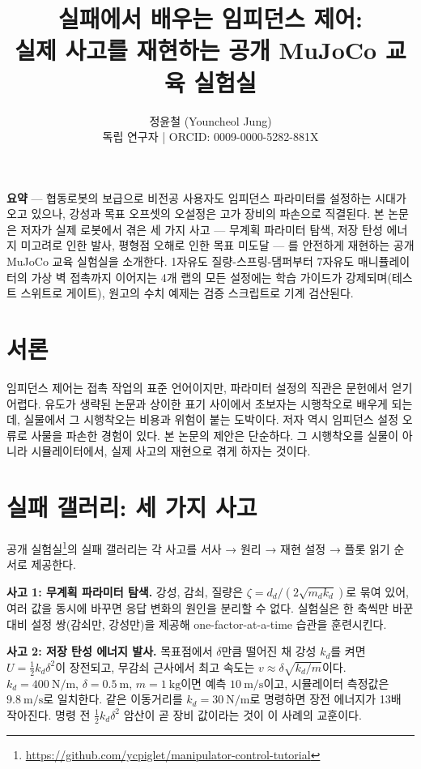 \documentclass[10pt,a4paper,twocolumn]{article}
\title{\textbf{실패에서 배우는 임피던스 제어:\\실제 사고를 재현하는 공개 MuJoCo 교육 실험실}}
\author{정윤철 (Youncheol Jung)\\
\small 독립 연구자 | ORCID: 0009-0000-5282-881X}
\date{}
\begin{document}
\maketitle

\noindent\textbf{요약} ---
협동로봇의 보급으로 비전공 사용자도 임피던스 파라미터를 설정하는 시대가
오고 있으나, 강성과 목표 오프셋의 오설정은 고가 장비의 파손으로 직결된다.
본 논문은 저자가 실제 로봇에서 겪은 세 가지 사고 --- 무계획 파라미터 탐색,
저장 탄성 에너지 미고려로 인한 발사, 평형점 오해로 인한 목표 미도달 ---
를 안전하게 재현하는 공개 MuJoCo 교육 실험실을 소개한다.
1자유도 질량-스프링-댐퍼부터 7자유도 매니퓰레이터의 가상 벽 접촉까지
이어지는 4개 랩의 모든 설정에는 학습 가이드가 강제되며(테스트 스위트로
게이트), 원고의 수치 예제는 검증 스크립트로 기계 검산된다.

\section{서론}

임피던스 제어는 접촉 작업의 표준 언어이지만, 파라미터 설정의 직관은
문헌에서 얻기 어렵다.
유도가 생략된 논문과 상이한 표기 사이에서 초보자는 시행착오로 배우게
되는데, 실물에서 그 시행착오는 비용과 위험이 붙는 도박이다.
저자 역시 임피던스 설정 오류로 사물을 파손한 경험이 있다.
본 논문의 제안은 단순하다.
그 시행착오를 실물이 아니라 시뮬레이터에서, 실제 사고의 재현으로 겪게
하자는 것이다.

\section{실패 갤러리: 세 가지 사고}

공개 실험실\footnote{\url{https://github.com/ycpiglet/manipulator-control-tutorial}}의
실패 갤러리는 각 사고를 서사 → 원리 → 재현 설정 → 플롯 읽기 순서로
제공한다.

\textbf{사고 1: 무계획 파라미터 탐색.}
강성, 감쇠, 질량은 \(\zeta=d_d/(2\sqrt{m_dk_d})\)로 묶여 있어, 여러 값을
동시에 바꾸면 응답 변화의 원인을 분리할 수 없다.
실험실은 한 축씩만 바꾼 대비 설정 쌍(감쇠만, 강성만)을 제공해
one-factor-at-a-time 습관을 훈련시킨다.

\textbf{사고 2: 저장 탄성 에너지 발사.}
목표점에서 \(\delta\)만큼 떨어진 채 강성 \(k_d\)를 켜면
\(U=\frac{1}{2}k_d\delta^2\)이 장전되고, 무감쇠 근사에서 최고 속도는
\(v\approx\delta\sqrt{k_d/m}\)이다.
\(k_d=400~\mathrm{N/m}\), \(\delta=0.5~\mathrm{m}\), \(m=1~\mathrm{kg}\)이면
예측 \(10~\mathrm{m/s}\)이고, 시뮬레이터 측정값은 \(9.8~\mathrm{m/s}\)로
일치한다.
같은 이동거리를 \(k_d=30~\mathrm{N/m}\)로 명령하면 장전 에너지가 13배
작아진다.
명령 전 \(\frac{1}{2}k_d\delta^2\) 암산이 곧 장비 값이라는 것이 이 사례의
교훈이다.
\end{document}
